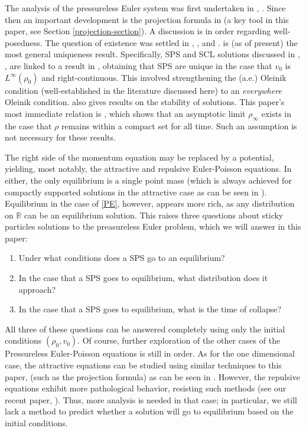 \documentclass[10pt,a4paper]{amsart}
\numberwithin{equation}{section}
\begin{document}
    The analysis of the pressureless Euler system was first undertaken in \cite{ERS}, \cite{BrenGren}. Since then an important development is the projection formula in \cite{Natile-Savare} (a key tool in this paper, see Section \ref{projection-section}). A discussion is in order regarding well-posedness. The question of existence was settled in \cite{Tudorascu-2008}, \cite{Hynd2019}, and \cite{hynd2020trajectorymappressurelesseuler}. \cite{Suder-Tudorascu} is (as of present) the most general uniqueness result. Specifically, SPS and SCL solutions discussed in \cite{BrenGren}, \cite{Tudorascu-2008}, are linked to a result in \cite{Huang-Wang}, obtaining that SPS are unique in the case that $v_0$ is $L^\infty(\rho_0)$ and right-continuous. This involved strengthening the (a.e.) Oleinik condition (well-established in the literature discussed here) to an \textit{everywhere} Oleinik condition. \cite{Natile-Savare} also gives results on the stability of solutions. This paper's most immediate relation is \cite{Hynd-Tudorascu}, which shows that an asymptotic limit $\rho_\infty$ exists in the case that $\rho$ remains within a compact set for all time. Such an assumption is not necessary for these results. 
    
    The right side of the momentum equation may be replaced by a potential, yielding, most notably, the attractive and repulsive Euler-Poisson equations. In either, the only equilibrium is a single point mass (which is always achieved for compactly supported solutions in the attractive case as can be seen in \cite{BLPTW}). Equilibrium in the case of \eqref{PE}, however, appears more rich, as any distribution on $\mathbb{R}$ can be an equilibrium solution. This raises three questions about sticky particles solutions to the preasureless Euler problem, which we will answer in this paper:  
    \begin{enumerate}
        \item Under what conditions does a SPS go to an equilibrium? %
        \item In the case that a SPS goes to equilibrium, what distribution does it approach?  
        \item In the case that a SPS goes to equilibrium, what is the time of collapse? 
    \end{enumerate}
    All three of these questions can be answered completely using only the initial conditions $(\rho_0,v_0)$. Of course, further exploration of the other cases of the Pressureless Euler-Poisson equations is still in order. As for the one dimensional case, the attractive equations can be studied using similar techniques to this paper, (such as the projection formula) as can be seen in \cite{BLPTW}. However, the repulsive equations exhibit more pathological behavior, resisting such methods (see our recent paper, \cite{Repulsive-Paper}). Thus, more analysis is needed in that case; in particular, we still lack a method to predict whether a solution will go to equilibrium based on the initial conditions.
\end{document}
